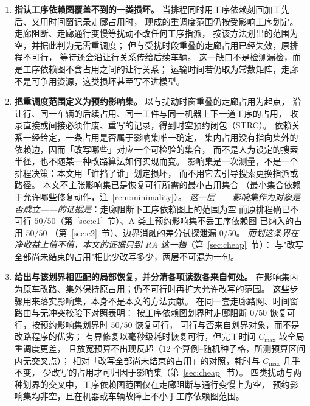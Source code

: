 \documentclass[manuscript,screen,review]{acmart}
\providecommand{\STRC}{\textsc{STRC}}
\newcommand{\NPairs}{50}
\newcommand{\PassMiss}{\NPairs/\NPairs}      %
\newcommand{\FeasRone}{0/\NPairs}            %
\newcommand{\FeasRtwo}{\NPairs/\NPairs}      %
\newcommand{\PassClosed}{\NPairs/\NPairs}    %
\newcommand{\EfiveCells}{12}        %
\newcommand{\ProbeLeakPairs}{0/50}
\begin{document}
\begin{enumerate}[leftmargin=1.6em,itemsep=0.4em]
\item \textbf{指认工序依赖图覆盖不到的一类损坏。}
当排程同时用工序依赖刻画加工先后、又用时间窗记录走廊占用时，
现成的重调度范围仍按受影响工序划定。
走廊阻断、走廊通行变慢等扰动不改任何工序指派，
按该方法划出的范围为空，并据此判为无需重调度；
但与受扰时段重叠的走廊占用已经失效，原排程不可行，
等待还会沿让行关系传给后续车辆。
这一缺口不是检测漏检，而是工序依赖图不含占用之间的让行关系；
运输时间若仍取为常数矩阵，走廊不是可争用资源，这类损坏甚至写不进模型。

\item \textbf{把重调度范围定义为预约影响集。}
以与扰动时窗重叠的走廊占用为起点，
沿让行、同一车辆的后续占用、同一工件与同一机器上下一道工序的占用，
收录直接或间接必须作废、重写的记录，得到时空预约闭包（\STRC）。
依赖关系一经给定，一条占用是否属于影响集唯一确定，
集内占用没有指向集外的依赖边，因而「改写哪些」对应一个可检验的集合，
而不是人为设定的搜索半径，也不随某一种改路算法如何实现而变。
影响集是一次测量，不是一个排程决策：本文用「谁挡了谁」划定损坏，
而不用它去引导搜索更换指派或路径。
本文不主张影响集已是恢复可行所需的最小占用集合
（最小集合依赖于允许哪些修复动作，注~\ref{rem:minimality}）。
\emph{这一层——影响集作为对象是否成立——的证据是}：走廊阻断下工序依赖图上的范围为空
而原排程确已不可行 \(\PassMiss\)（第~\ref{sec:e1}~节）、A 类上预约影响集不丢工序依赖图
已纳入的占用 \(\PassClosed\)
（第~\ref{sec:e2}~节）、边界消融的差分试探泄漏 \ProbeLeakPairs。
\emph{而划这条界在净收益上值不值，本文的证据只到 RA 这一档}（第~\ref{sec:cheap}~节）：
与"改写全部尚未结束的占用"相比少改写多少，两层不可混为一句。

\item \textbf{给出与该划界相匹配的局部恢复，并分清各项读数各来自何处。}
在影响集内为原车改路、集外保持原占用；仍不可行时再扩大允许改写的范围。
这些步骤用来落实影响集，本身不是本文的方法贡献。
在同一套走廊路网、时间窗路由与无冲突校验下对照表明：
按工序依赖图划界时走廊阻断 \(\FeasRone\) 恢复可行，按预约影响集划界时 \(\FeasRtwo\) 恢复可行，
可行与否来自划界对象，而不是改路程序的优劣；
有界修复以毫秒级耗时恢复可行，但完工时间 \(C_{\max}\) 较全局重调度更差，
且放宽预算不出现反超（\(\EfiveCells\) 个算例--随机种子格，所测预算区间内无交叉点）；
相对「改写全部尚未结束的占用」的对照，耗时与 \(C_{\max}\) 几乎不变，
少改写的占用才可归因于影响集（第~\ref{sec:cheap}~节）。
四类扰动与两种划界的交叉中，工序依赖图范围仅在走廊阻断与通行变慢上为空，
预约影响集均非空，且在机器或车辆故障上不小于工序依赖图范围。
\end{enumerate}
\end{document}

